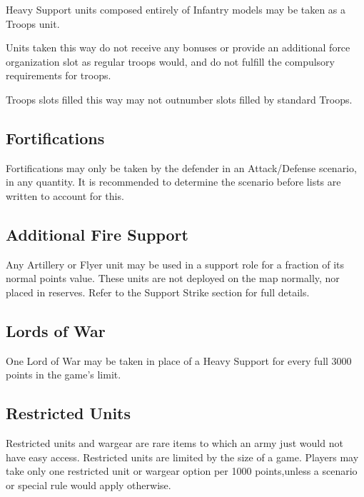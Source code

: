\documentclass[letterpaper,twocolumn,oneside,titlepage]{book}
\begin{document}
Heavy Support units composed entirely of Infantry models may be taken as
a Troops unit.

Units taken this way do not receive any bonuses or provide an additional
force organization slot as regular troops would, and do not fulfill the
compulsory requirements for troops.

Troops slots filled this way may not outnumber slots filled by standard
Troops.

\subsection{\texorpdfstring{\textbf{Fortifications}}{Fortifications}}\label{fortifications}

Fortifications may only be taken by the defender in an Attack/Defense
scenario, in any quantity. It is recommended to determine the scenario
before lists are written to account for this.

\subsection{\texorpdfstring{\textbf{Additional Fire
Support}}{Additional Fire Support}}\label{additional-fire-support}

Any Artillery or Flyer unit may be used in a support role for a fraction
of its normal points value. These units are not deployed on the map
normally, nor placed in reserves. Refer to the Support Strike section
for full details.

\subsection{\texorpdfstring{\textbf{Lords of
War}}{Lords of War}}\label{lords-of-war}

One Lord of War may be taken in place of a Heavy Support for every full
3000 points in the game's limit.

\subsection{\texorpdfstring{\textbf{Restricted
Units}}{Restricted Units}}\label{restricted-units}

Restricted units and wargear are rare items to which an army just would
not have easy access. Restricted units are limited by the size of a
game. Players may take only one restricted unit or wargear option per
1000 points,unless a scenario or special rule would apply otherwise.
\end{document}
